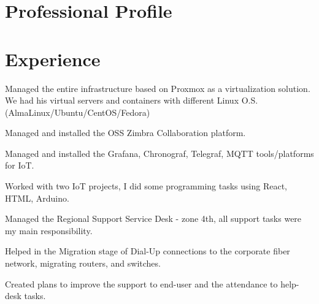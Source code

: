 \documentclass[]{plushcv}
\begin{document}
\begin{minipage}[t]{0.70\textwidth} 


\section{Professional Profile}
\runsubsection{}
\sectionsep

\section{Experience}
\vspace{\topsep} %
\begin{tightemize}
\sectionsep
\item Managed the entire infrastructure based on Proxmox as a virtualization solution. We had his virtual servers and containers with different Linux O.S. (AlmaLinux/Ubuntu/CentOS/Fedora)
\item Managed and installed the OSS Zimbra Collaboration platform.
\item Managed and installed the Grafana, Chronograf, Telegraf, MQTT tools/platforms for IoT.
\item Worked with two IoT projects, I did some programming tasks using React, HTML, Arduino.
\end{tightemize}
\sectionsep

\begin{tightemize}
\sectionsep
\item Managed the Regional Support Service Desk - zone 4th, all support tasks were my main responsibility.
\item Helped in the Migration stage of Dial-Up connections to the corporate fiber network, migrating routers, and switches.
\item Created plans to improve the support to end-user and the attendance to help-desk tasks.
\end{tightemize}
\sectionsep


\end{minipage}
\end{document}
